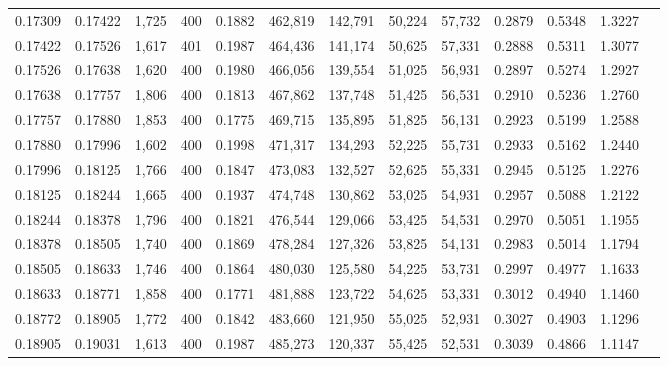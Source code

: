 \begin{tabular}{rrrrrrrrrrrrr}
0.17309 & 0.17422 &  1,725 & 400 &                                     0.1882 & 462,819 & 142,791 &  50,224 &  57,732 & 0.2879 & 0.5348 & 1.3227 \\
0.17422 & 0.17526 &  1,617 & 401 &                                     0.1987 & 464,436 & 141,174 &  50,625 &  57,331 & 0.2888 & 0.5311 & 1.3077 \\
0.17526 & 0.17638 &  1,620 & 400 &                                     0.1980 & 466,056 & 139,554 &  51,025 &  56,931 & 0.2897 & 0.5274 & 1.2927 \\
0.17638 & 0.17757 &  1,806 & 400 &                                     0.1813 & 467,862 & 137,748 &  51,425 &  56,531 & 0.2910 & 0.5236 & 1.2760 \\
0.17757 & 0.17880 &  1,853 & 400 &                                     0.1775 & 469,715 & 135,895 &  51,825 &  56,131 & 0.2923 & 0.5199 & 1.2588 \\
0.17880 & 0.17996 &  1,602 & 400 &                                     0.1998 & 471,317 & 134,293 &  52,225 &  55,731 & 0.2933 & 0.5162 & 1.2440 \\
0.17996 & 0.18125 &  1,766 & 400 &                                     0.1847 & 473,083 & 132,527 &  52,625 &  55,331 & 0.2945 & 0.5125 & 1.2276 \\
0.18125 & 0.18244 &  1,665 & 400 &                                     0.1937 & 474,748 & 130,862 &  53,025 &  54,931 & 0.2957 & 0.5088 & 1.2122 \\
0.18244 & 0.18378 &  1,796 & 400 &                                     0.1821 & 476,544 & 129,066 &  53,425 &  54,531 & 0.2970 & 0.5051 & 1.1955 \\
0.18378 & 0.18505 &  1,740 & 400 &                                     0.1869 & 478,284 & 127,326 &  53,825 &  54,131 & 0.2983 & 0.5014 & 1.1794 \\
0.18505 & 0.18633 &  1,746 & 400 &                                     0.1864 & 480,030 & 125,580 &  54,225 &  53,731 & 0.2997 & 0.4977 & 1.1633 \\
0.18633 & 0.18771 &  1,858 & 400 &                                     0.1771 & 481,888 & 123,722 &  54,625 &  53,331 & 0.3012 & 0.4940 & 1.1460 \\
0.18772 & 0.18905 &  1,772 & 400 &                                     0.1842 & 483,660 & 121,950 &  55,025 &  52,931 & 0.3027 & 0.4903 & 1.1296 \\
0.18905 & 0.19031 &  1,613 & 400 &                                     0.1987 & 485,273 & 120,337 &  55,425 &  52,531 & 0.3039 & 0.4866 & 1.1147 \\

\end{tabular}
